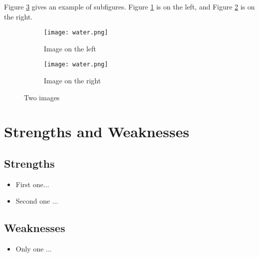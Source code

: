 \documentclass[12pt]{article}  %
\begin{document}
	Figure \ref{fig:subfigures} gives an example of subfigures. Figure \ref{subfig:left} is on the left, and Figure \ref{subfig:right} is on the right.
	
	\begin{figure}[htbp]
		\centering
		\begin{subfigure}[b]{.4\textwidth}
			\texttt{[image: water.png]}
			\caption{Image on the left}\label{subfig:left}
		\end{subfigure}
		\begin{subfigure}[b]{.4\textwidth}
			\texttt{[image: water.png]}
			\caption{Image on the right}\label{subfig:right}
		\end{subfigure}
		\caption{Two images}\label{fig:subfigures}
	\end{figure}
	
	\section{Strengths and Weaknesses}
	\subsection{Strengths}
	\begin{itemize}
		\item First one...
		\item Second one ...
	\end{itemize}
	
	\subsection{Weaknesses}
	\begin{itemize}
		\item Only one ...
	\end{itemize}
	
\end{document}
